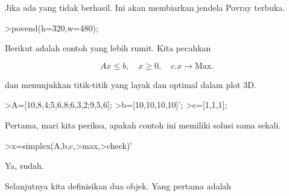 \documentclass{article}
\begin{document}
\begin{eulernotebook}
\begin{eulercomment}
\begin{eulercomment}
\begin{eulercomment}
Jika ada yang tidak berhasil. Ini akan membiarkan jendela Povray
terbuka.
\end{eulercomment}
\begin{eulerprompt}
>povend(h=320,w=480);
\end{eulerprompt}
\begin{eulercomment}
Berikut adalah contoh yang lebih rumit. Kita pecahkan

\end{eulercomment}
\begin{eulerformula}
\[
Ax \le b, \quad x \ge 0, \quad c.x \to \text{Max.}
\]
\end{eulerformula}
\begin{eulercomment}
dan menunjukkan titik-titik yang layak dan optimal dalam plot 3D.
\end{eulercomment}
\begin{eulerprompt}
>A=[10,8,4;5,6,8;6,3,2;9,5,6];
>b=[10,10,10,10]';
>c=[1,1,1];
\end{eulerprompt}
\begin{eulercomment}
Pertama, mari kita periksa, apakah contoh ini memiliki solusi sama
sekali.
\end{eulercomment}
\begin{eulerprompt}
>x=simplex(A,b,c,>max,>check)'
\end{eulerprompt}
\begin{euleroutput}
  [0,  1,  0.5]
\end{euleroutput}
\begin{eulercomment}
Ya, sudah.

Selanjutnya kita definisikan dua objek. Yang pertama adalah


\end{eulercomment}
\end{eulercomment}
\end{eulercomment}
\end{eulernotebook}
\end{document}

